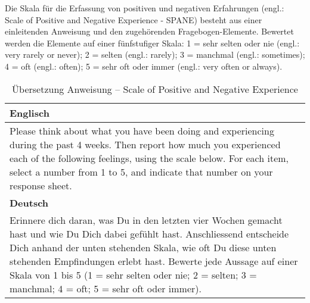 \begin{RaggedRight}
Die Skala für die Erfassung von positiven und negativen Erfahrungen (engl.: Scale of Positive and Negative Experience - SPANE) \cite{Diener:2010} besteht aus einer einleitenden Anweisung und den zugehörenden Fragebogen-Elemente. Bewertet werden die Elemente auf einer fünfstufiger Skala: 1 = sehr selten oder nie (engl.: very rarely or never); 2 = selten (engl.: rarely); 3 = manchmal (engl.: sometimes); 4 = oft (engl.: often); 5 = sehr oft oder immer (engl.: very often or always). 

\begin{center}
    \begin{longtable}[t]{|p{15 cm}|}
    \caption{Übersetzung Anweisung -- Scale of Positive and Negative Experience} \\ \hline
        \textbf{Englisch} \\ \hline
        Please think about what you have been doing and experiencing during the past 4 weeks. Then report how much you experienced each of the following feelings, using the scale below. For each item, select a number from 1 to 5, and indicate that number on your response sheet. \\ \hline
        \textbf{Deutsch} \\ \hline 
        Erinnere dich daran, was Du in den letzten vier Wochen gemacht hast und wie Du Dich dabei gefühlt hast. Anschliessend entscheide Dich anhand der unten stehenden Skala, wie oft Du diese unten stehenden Empfindungen erlebt hast. Bewerte jede Aussage auf einer Skala von 1 bis 5 (1 = sehr selten oder nie; 2 = selten; 3 = manchmal; 4 = oft; 5 = sehr oft oder immer). \\ \hline   
    \end{longtable}
	\label{tab:SpaneAnweisung}
\end{center}


\end{RaggedRight}
